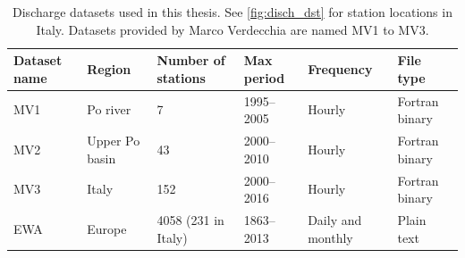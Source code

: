 \begin{table}[]
\centering
\begin{tabular}{@{}m{1.3cm}m{1.5cm}m{1.8cm}m{2cm}m{1.8cm}m{1.8cm}@{}}
\toprule
Dataset name & Region & Number of stations & Max period & Frequency & File type \\ \midrule
MV1 & Po river & 7 & 1995--2005 & Hourly & Fortran binary \\
MV2 & Upper Po basin & 43 & 2000--2010 & Hourly & Fortran binary \\
MV3 & Italy & 152 & 2000--2016 & Hourly & Fortran binary \\
EWA & Europe & 4058 (231 in Italy) & 1863--2013 & Daily and monthly & Plain text \\ \bottomrule
\end{tabular}
\caption[List of discharge observations]{Discharge datasets used in this thesis. See \cref{fig:disch_dst} for station locations in Italy. Datasets provided by Marco Verdecchia are named MV1 to MV3.}\label{tab:disc_dst}
\end{table}


